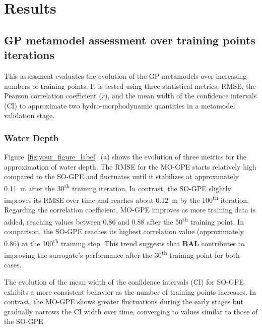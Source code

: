 \documentclass[draft,linenumbers,onecolumn]{agujournal2019} %
\begin{document}
\section{Results}

\subsection{GP metamodel assessment over training points iterations}

This assessment evaluates the evolution of the GP metamodels over increasing numbers of training points. It is tested using three statistical metrics: RMSE, the Pearson correlation coefficient ($r$), and the mean width of the confidence intervals (CI) to approximate two hydro-morphodynamic quantities in a metamodel validation stage. 

\subsubsection{Water Depth}
Figure~\ref{fig:your_figure_label}~(a) shows the evolution of three metrics for the approximation of water depth. The RMSE for the MO-GPE starts relatively high compared to the SO-GPE and fluctuates until it stabilizes at approximately 0.11~m after the 30\textsuperscript{th} training iteration. In contrast, the SO-GPE slightly improves its RMSE over time and reaches about 0.12~m by the 100\textsuperscript{th} iteration.
Regarding the correlation coefficient, MO-GPE improves as more training data is added, reaching values between 0.86 and 0.88 after the 50\textsuperscript{th} training point. In comparison, the SO-GPE reaches its highest correlation value (approximately 0.86) at the 100\textsuperscript{th} training step. This trend suggests that \textbf{BAL} contributes to improving the surrogate’s performance after the 30\textsuperscript{th} training point for both cases.

The evolution of the mean width of the confidence intervals (CI) for SO-GPE exhibits a more consistent behavior as the number of training points increases. In contrast, the MO-GPE shows greater fluctuations during the early stages but gradually narrows the CI width over time, converging to values similar to those of the SO-GPE.
\end{document}

